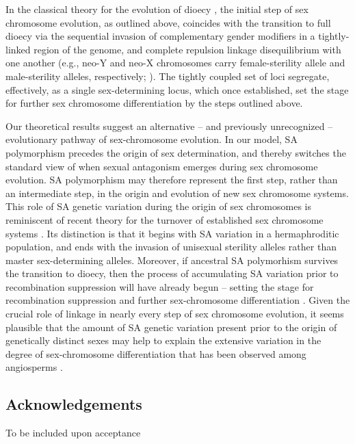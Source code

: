 \documentclass{article}
\begin{document}
In the classical theory for the evolution of dioecy \citep{Charlesworth1978a}, the initial step of sex chromosome evolution, as outlined above, coincides with the transition to full dioecy via the sequential invasion of complementary gender modifiers in a tightly-linked region of the genome, and complete repulsion linkage disequilibrium with one another (e.g., neo-Y and neo-X chromosomes carry female-sterility allele and male-sterility alleles, respectively; \citealt{Charlesworth1978a}). The tightly coupled set of loci segregate, effectively, as a single sex-determining locus, which once established, set the stage for further sex chromosome differentiation by the steps outlined above.

Our theoretical results suggest an alternative -- and previously unrecognized -- evolutionary pathway of sex-chromosome evolution. In our model, SA polymorphism precedes the origin of sex determination, and thereby switches the standard view of when sexual antagonism emerges during sex chromosome evolution. SA polymorphism may therefore represent the first step, rather than an intermediate step, in the origin and evolution of new sex chromosome systems. This role of SA genetic variation during the origin of sex chromosomes is reminiscent of recent theory for the turnover of established sex chromosome systems \citep{vanDoornKirkpatrick2007,vanDoornKirkpatrick2010}. Its distinction is that it begins with SA variation in a hermaphroditic population, and ends with the invasion of unisexual sterility alleles rather than master sex-determining alleles. Moreover, if ancestral SA polymorhism survives the transition to dioecy, then the process of accumulating SA variation prior to recombination suppression will have already begun -- setting the stage for recombination suppression and further sex-chromosome differentiation \citep{Charlesworth1978a,Rice1987,Bachtrog2006,Qiuetal2013}. Given the crucial role of linkage in nearly every step of sex chromosome evolution, it seems plausible that the amount of SA genetic variation present prior to the origin of genetically distinct sexes may help to explain the extensive variation in the degree of sex-chromosome differentiation that has been observed among angiosperms \citep{Charlesworth2002,Renner2014,Bachtrog2014}.


\subsection*{Acknowledgements}
To be included upon acceptance
\end{document}
